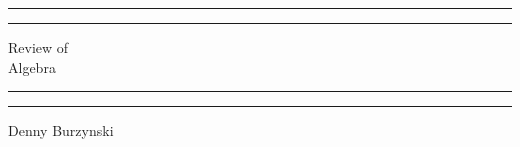 \documentclass[12pt,hidelinks]{article}
\begin{document}
\begin{titlepage}
        \centering %
        \scshape %
        \vspace*{1.5\baselineskip} %

        \rule{13cm}{1.6pt}\vspace*{-\baselineskip}\vspace*{2pt} %
        \rule{13cm}{0.4pt} %

                \vspace{0.75\baselineskip} %
        {       \Huge Review of \\
                        \vspace{4mm}
                Algebra\\    }
                \vspace{0.75\baselineskip} %
        \rule{13cm}{0.4pt}\vspace*{-\baselineskip}\vspace{3.2pt} %
        \rule{13cm}{1.6pt} %

                \vspace{1.75\baselineskip} %
        {\large Denny Burzynski }
        \vfill
\vspace{1mm}
\end{titlepage}
\tableofcontents

\newpage









\end{document}
